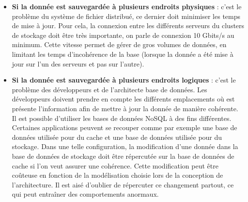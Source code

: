 	\begin{itemize}
		\item \textbf{Si la donnée est sauvegardée à plusieurs endroits physiques} : c'est le problème du système de fichier distribué, ce dernier doit minimiser les temps de mise à jour. Pour cela, la connexion entre les différents serveurs du clusters de stockage doit être très importante, on parle de connexion 10 Gbits/s au minimum. Cette vitesse permet de gérer de gros volumes de données, en limitant les temps d'incohérence de la base (lorsque la donnée a été mise à jour sur l'un des serveurs et pas sur l'autre).
		\item \textbf{Si la donnée est sauvegardée à plusieurs endroits logiques} : c'est le problème des développeurs et de l'architecte base de données. Les développeurs doivent prendre en compte les différents emplacements où est présente l'information afin de mettre à jour la donnée de manière cohérente. Il est possible d'utiliser les bases de données NoSQL à des fins différentes. Certaines applications peuvent se recouper comme par exemple une base de données utilisée pour du cache et une base de données utilisée pour du stockage. Dans une telle configuration, la modification d'une donnée dans la base de données de stockage doit être répercutée sur la base de données de cache si l'on veut assurer une cohérence. Cette modification peut être coûteuse en fonction de la modélisation choisie lors de la conception de l'architecture. Il est aisé d'oublier de répercuter ce changement partout, ce qui peut entraîner des comportements anormaux.
	\end{itemize}